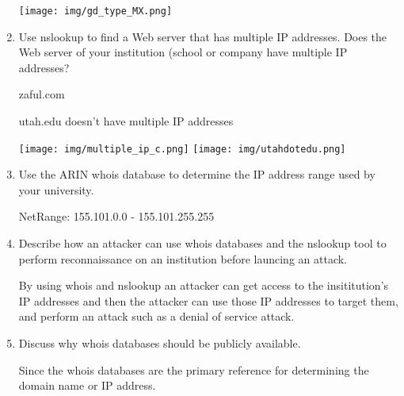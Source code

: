 \documentclass[11pt]{article}
\begin{document}
\begin{enumerate}[label=(\alph*)]
\begin{center}
\texttt{[image: img/gd\_type\_MX.png]}
\end{center}


\item Use nslookup to find a Web server that has multiple IP addresses. Does the Web server of your institution (school or company have multiple IP addresses?

zaful.com

utah.edu doesn't have multiple IP addresses

\begin{center}
\texttt{[image: img/multiple\_ip\_c.png]}
\texttt{[image: img/utahdotedu.png]}

\end{center}

\item Use the ARIN whois database to determine the IP address range used by your university.

NetRange:       155.101.0.0 - 155.101.255.255

\item Describe how an attacker can use whois databases and the nslookup tool to perform reconnaissance on an institution before launcing an attack.

By using whois and nslookup an attacker can get access to the insititution's IP addresses and then the attacker can use those IP addresses to target them, and perform an attack such as a denial of service attack.

\item Discuss why whois databases should be publicly available.

Since the whois databases are the primary reference for determining the domain name or IP address.

\end{enumerate}
\end{document}

